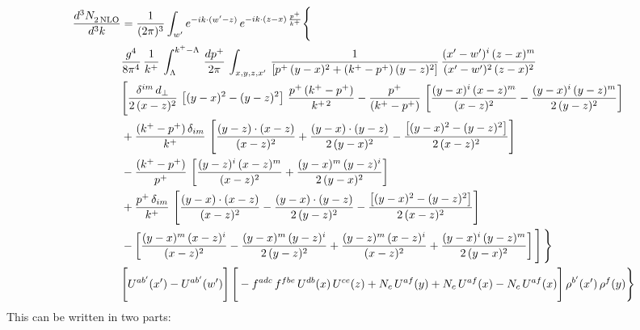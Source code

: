 \documentclass[9pt]{article}
\numberwithin{equation}{section}
\begin{document}
\begin{align}
    \frac{d^{3}N_{2\,\rm NLO}^{\rm}}{d^{3}k}  & =  \frac{1}{(2\pi)^{3}}  \int_{ w^\prime} e^{-ik\cdot(w'-z)}\,e^{-ik\cdot (z-x)\,\frac{p^{+}}{k^{+}}} \Bigg\{\notag \\ & \frac{g^{4}}{8\pi^{4}}\,\frac{1}{k^{+}}\,\int_{\Lambda}^{k^{+}-\Lambda}\, \frac{dp^{+}}{2\pi} \, \int_{x,y,z,x'}\,\frac{1}{\left[p^{+}\,(y-x)^{2}+(k^{+}-p^{+})\,(y-z)^{2}\right]}\, \frac{(x'-w')^{i}\,(z-x)^{m}}{(x'-w')^{2}\,(z-x)^{2}} \notag \\ & \Bigg[\frac{\delta^{im}\,d_{\perp}}{2\,(x-z)^{2}}\,\left[(y-x)^{2}-(y-z)^{2}\right]\,\frac{p^{+}\,(k^{+}-p^{+})}{k^{+\,2}}-\frac{p^{+}}{(k^{+}-p^{+})}\,\left[\frac{(y-x)^{i}\,(x-z)^{m}}{(x-z)^{2}}-\frac{(y-x)^{i}\,(y-z)^{m}}{2\,(y-z)^{2}}\right]\notag \\ & +\frac{(k^{+}-p^{+})\,\delta_{im}}{k^{+}}\,\left[\frac{(y-z)\cdot (x-z)}{(x-z)^{2}}+\frac{(y-x)\cdot (y-z)}{2\,(y-x)^{2}}-\frac{\left[(y-x)^{2}-(y-z)^{2}\right]}{2\,(x-z)^{2}}\right]\notag \\ & -\frac{(k^{+}-p^{+})}{p^{+}}\,\left[\frac{(y-z)^{i}\,(x-z)^{m}}{(x-z)^{2}}+\frac{(y-x)^{m}\,(y-z)^{i}}{2\,(y-x)^{2}}\right]\notag \\ & +\frac{p^{+}\,\delta_{im}}{k^{+}}\,\left[\frac{(y-x)\cdot (x-z)}{(x-z)^{2}}-\frac{(y-x)\cdot (y-z)}{2\,(y-z)^{2}}-\frac{\left[(y-x)^{2}-(y-z)^{2}\right]}{2\,(x-z)^{2}}\right]\notag \\ &-\left[\frac{(y-x)^{m}\,(x-z)^{i}}{(x-z)^{2}}-\frac{(y-x)^{m}\,(y-z)^{i}}{2\,(y-z)^{2}}+\frac{(y-z)^{m}\,(x-z)^{i}}{(x-z)^{2}}+\frac{(y-x)^{i}\,(y-z)^{m}}{2\,(y-x)^{2}}\right]\Bigg]\,\Bigg\} \notag \\ & \Bigg[U^{ab'}(x')-U^{ab'}(w')\Bigg]\,\Bigg[-f^{adc}\,f^{fbe}\,U^{db}(x)\,U^{ce}(z)+N_{c}\,U^{af}(y)+N_{c}\,U^{af}(x) -N_{c}\,U^{af}(x)\Bigg]\,\rho^{b'}(x')\,\rho^{f}(y)\Bigg\}
\end{align}
This can be written in two parts: 
\end{document}

